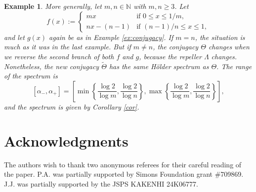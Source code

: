\documentclass[11pt]{amsart}
\newcommand{\1}{1}
\newcommand{\N}{\mathbb{N}}
\newtheorem{example}[theorem]{Example}
\begin{document}
\begin{example}
{\rm
 More generally, let $m,n\in \N$ with $m,n\ge 3$. Let
\[
f(x):=\begin{cases} mx & \mbox{if $0\leq x\leq 1/m$},\\
nx-(n-1) & \mbox{if $(n-1)/n\leq x\leq 1$}, 
\end{cases}
\]
and let $g(x)$ again be as in Example \ref{ex:conjugacy}.
If $m=n$, the situation is much as it was in the last example. But if $m\neq n$, the conjugacy $\Theta$ changes when we reverse the second branch of both $f$ and $g$, because the repeller $\Lambda$ changes. Nonetheless, the new conjugacy $\tilde{\Theta}$ has the same H\"older spectrum as $\Theta$. The range of the spectrum is 
\[
[\alpha_-,\alpha_+]=\left[\min\left\{\frac{\log 2}{\log m},\frac{\log 2}{\log n}\right\},\max\left\{\frac{\log 2}{\log m},\frac{\log 2}{\log n}\right\}\right],
\]
and the spectrum is given by Corollary \ref{cor}.
}
\end{example}


\section*{Acknowledgments}
{The authors wish to thank two anonymous referees for their careful reading of the paper.}
P.A. was partially supported by Simons Foundation grant \#709869.
J.J. was partially supported by the JSPS KAKENHI 24K06777.
\small
\end{document}
